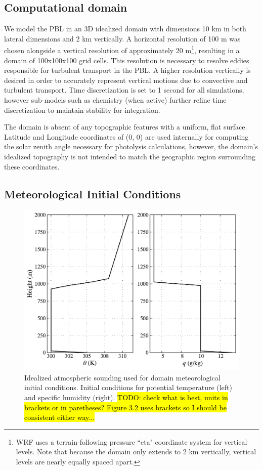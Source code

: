 \fi


\subsection{Computational domain}
We model the PBL in an 3D idealized domain with dimensions 10 km in both lateral dimensions and 2 km vertically. A horizontal resolution of 100 m was chosen alongside a vertical resolution of approximately 20 m\footnote{WRF uses a terrain-following pressure ``eta" coordinate system for vertical levels. Note that because the domain only extends to 2 km vertically, vertical levels are nearly equally spaced apart.}, resulting in a domain of 100x100x100 grid cells. This resolution is necessary to resolve eddies responsible for turbulent transport in the PBL. A higher resolution vertically is desired in order to accurately represent vertical motions due to convective and turbulent transport. Time discretization is set to 1 second for all simulations, however sub-models such as chemistry (when active) further refine time discretization to maintain stability for integration. 

The domain is absent of any topographic features with a uniform, flat surface.  Latitude and Longitude coordinates of (0, 0) are used internally for computing the solar zenith angle necessary for photolysis calculations, however, the domain's idealized topography is not intended to match the geographic region surrounding these coordinates. 

\subsection{Meteorological Initial Conditions}
 
 \begin{figure}[h]
	\centering
	\includegraphics[width=\textwidth]{figures/chapter3/WRF-LES_default_sounding.pdf}
	\caption{Idealized atmospheric sounding used for domain meteorological initial conditions. Initial conditions for potential temperature (left) and specific humidity (right). \hl{TODO: check what is best, units in brackets or in paretheses? Figure 3.2 uses brackets so I should be consistent either way...}}
	\label{fig:sounding}
\end{figure}

